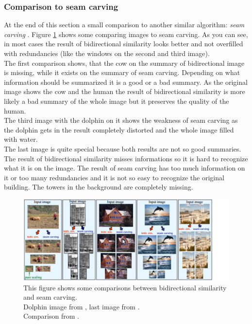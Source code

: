 
\subsubsection*{Comparison to seam carving}
At the end of this section a small comparison to another similar algorithm: \textit{seam carving} \cite{seamcarv}.
Figure \ref{fig:Seam carving} shows some comparing images to seam carving. As you can see, in most cases the result of bidirectional similarity looks better and not overfilled with redundancies (like the windows on the second and third image).\\
The first comparison shows, that the cow on the summary of bidirectional image is missing, while it exists on the summary of seam carving. Depending on what information should be summarized it is a good or a bad summary. As the original image shows the cow and the human the result of bidirectional similarity is more likely a bad summary of the whole image but it preserves the quality of the human.\\
The third image with the dolphin on it shows the weakness of seam carving as the dolphin gets in the result completely distorted and the whole image filled with water.\\
The last image is quite special because both results are not so good summaries. The result of bidirectional similarity misses informations so it is hard to recognize what it is on the image. The result of seam carving has too much information on it or too many redundancies and it is not so easy to recognize the original building. The towers in the background are completely missing.\\


\begin{figure}[h]
\centering
\includegraphics[scale=0.95]{img/seamcarving}
\caption[Seam carving]{This figure shows some comparisons between bidirectional similarity and seam carving.\\ Dolphin image from \cite{seamcarv}, last image from \cite{wolf}.\\
Comparison from \cite{bisi}.}
\label{fig:Seam carving}
\end{figure}
